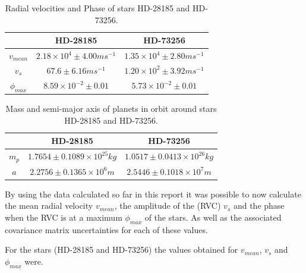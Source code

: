 \documentclass[]{article}
\begin{document}
\begin{table}[t]
  \begin{center}
    \caption{Radial velocities and Phase of stars HD-28185 and HD-73256.}
    \label{tab:table1}
    \begin{tabular}{c|c|c}
       & {HD-28185} & {HD-73256} \\
      \hline
      $v_{mean} $ & $ 2.18\times10^4 \pm4.00ms^{-1}$ & $1.35\times10^4\pm2.80ms^{-1}$ \\
      \hline
      $v_{s}$ & $67.6\pm6.16ms^{-1} $ & $1.20\times10^2\pm3.92ms^{-1}$\\
      \hline
      $\phi_{max}$ & $8.59\times10^{-2} \pm 0.01$ & $5.73\times10^{-2}\pm0.01$  \\
      
    \end{tabular}
  \end{center}
\end{table}
\begin{table}[t]
  \begin{center}
    \caption{Mass and semi-major axis of planets in orbit around stars HD-28185 and HD-73256.}
    \label{tab:table2}
    \begin{tabular}{c|c|c}
       & {HD-28185} & {HD-73256} \\
      \hline
      $m_p$ & $1.7654\pm0.1089\times10^{25}kg$ & $1.0517\pm0.0413\times10^{26}kg$ \\
      \hline
      $a$ & $2.2756\pm0.1365\times10^{6}m$ & $2.5446\pm0.1018\times10^{7}m$\\
      
    \end{tabular}
  \end{center}
\end{table}


By using the data calculated so far in this report it was possible to now calculate 
the mean radial velocity $v_{mean} $, the amplitude of the (RVC)
 $v_{s}$ and the 
phase when the RVC is at a maximum $\phi_{max}$ of the stars.
As well as the associated covariance matrix uncertainties for each of these values.
\par
For the stars (HD-28185 and HD-73256) the values obtained for $v_{mean}$, $v_{s}$ 
and $\phi_{max}$ were.
\end{document}
